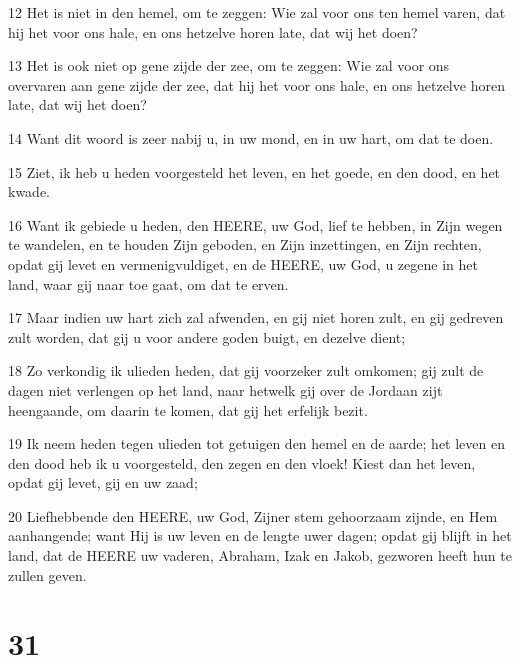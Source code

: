 \par 12 Het is niet in den hemel, om te zeggen: Wie zal voor ons ten hemel varen, dat hij het voor ons hale, en ons hetzelve horen late, dat wij het doen?
\par 13 Het is ook niet op gene zijde der zee, om te zeggen: Wie zal voor ons overvaren aan gene zijde der zee, dat hij het voor ons hale, en ons hetzelve horen late, dat wij het doen?
\par 14 Want dit woord is zeer nabij u, in uw mond, en in uw hart, om dat te doen.
\par 15 Ziet, ik heb u heden voorgesteld het leven, en het goede, en den dood, en het kwade.
\par 16 Want ik gebiede u heden, den HEERE, uw God, lief te hebben, in Zijn wegen te wandelen, en te houden Zijn geboden, en Zijn inzettingen, en Zijn rechten, opdat gij levet en vermenigvuldiget, en de HEERE, uw God, u zegene in het land, waar gij naar toe gaat, om dat te erven.
\par 17 Maar indien uw hart zich zal afwenden, en gij niet horen zult, en gij gedreven zult worden, dat gij u voor andere goden buigt, en dezelve dient;
\par 18 Zo verkondig ik ulieden heden, dat gij voorzeker zult omkomen; gij zult de dagen niet verlengen op het land, naar hetwelk gij over de Jordaan zijt heengaande, om daarin te komen, dat gij het erfelijk bezit.
\par 19 Ik neem heden tegen ulieden tot getuigen den hemel en de aarde; het leven en den dood heb ik u voorgesteld, den zegen en den vloek! Kiest dan het leven, opdat gij levet, gij en uw zaad;
\par 20 Liefhebbende den HEERE, uw God, Zijner stem gehoorzaam zijnde, en Hem aanhangende; want Hij is uw leven en de lengte uwer dagen; opdat gij blijft in het land, dat de HEERE uw vaderen, Abraham, Izak en Jakob, gezworen heeft hun te zullen geven.

\chapter{31}

